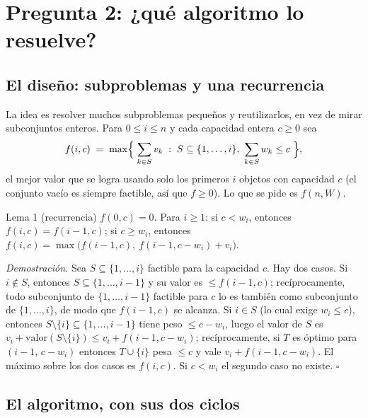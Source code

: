 \documentclass[11pt]{article}
\begin{document}
\section{Pregunta 2: ¿qué algoritmo lo resuelve?}

\subsection*{El diseño: subproblemas y una recurrencia}

La idea es resolver muchos subproblemas pequeños y reutilizarlos, en vez de mirar subconjuntos enteros. Para
$0\le i\le n$ y cada capacidad entera $c\ge0$ sea
\[
  f(i,c)\;=\;\max\Bigl\{\;\sum_{k\in S}v_k\;:\;S\subseteq\{1,\dots,i\},\ \sum_{k\in S}w_k\le c\;\Bigr\},
\]
el mejor valor que se logra usando solo los primeros $i$ objetos con capacidad $c$ (el conjunto vacío es
siempre factible, así que $f\ge0$). Lo que se pide es $f(n,W)$.

\begin{resultado}{Lema 1 (recurrencia)}
$f(0,c)=0$. Para $i\ge1$: si $c<w_i$, entonces $f(i,c)=f(i-1,c)$; si $c\ge w_i$, entonces
$f(i,c)=\max\bigl(f(i-1,c),\ f(i-1,c-w_i)+v_i\bigr)$.
\end{resultado}

\textit{Demostración.} Sea $S\subseteq\{1,\dots,i\}$ factible para la capacidad $c$. Hay dos casos.
Si $i\notin S$, entonces $S\subseteq\{1,\dots,i-1\}$ y su valor es $\le f(i-1,c)$; recíprocamente, todo
subconjunto de $\{1,\dots,i-1\}$ factible para $c$ lo es también como subconjunto de $\{1,\dots,i\}$, de modo
que $f(i-1,c)$ se alcanza. Si $i\in S$ (lo cual exige $w_i\le c$), entonces $S\setminus\{i\}\subseteq
\{1,\dots,i-1\}$ tiene peso $\le c-w_i$, luego el valor de $S$ es $v_i+\mathrm{valor}(S\setminus\{i\})\le
v_i+f(i-1,c-w_i)$; recíprocamente, si $T$ es óptimo para $(i-1,\,c-w_i)$ entonces $T\cup\{i\}$ pesa $\le c$ y
vale $v_i+f(i-1,c-w_i)$. El máximo sobre los dos casos es $f(i,c)$. Si $c<w_i$ el segundo caso no existe.
$\square$

\subsection*{El algoritmo, con sus dos ciclos}
\end{document}
